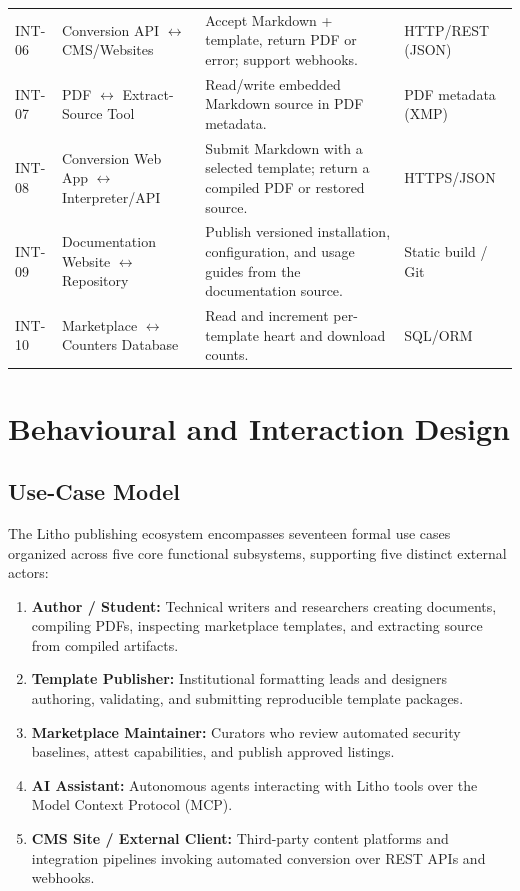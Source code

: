 \begin{xltabular}{\textwidth}{@{}p{0.13\textwidth}p{0.24\textwidth}X X@{}}
INT-06 & Conversion API $\leftrightarrow$ CMS/Websites & Accept Markdown + template, return PDF or error; support webhooks. & HTTP/REST (JSON) \\
INT-07 & PDF $\leftrightarrow$ Extract-Source Tool & Read/write embedded Markdown source in PDF metadata. & PDF metadata (XMP) \\
INT-08 & Conversion Web App $\leftrightarrow$ Interpreter/API & Submit Markdown with a selected template; return a compiled PDF or restored source. & HTTPS/JSON \\
INT-09 & Documentation Website $\leftrightarrow$ Repository & Publish versioned installation, configuration, and usage guides from the documentation source. & Static build / Git \\
INT-10 & Marketplace $\leftrightarrow$ Counters Database & Read and increment per-template heart and download counts. & SQL/ORM \\
\end{xltabular}


\section{Behavioural and Interaction Design}
\subsection{Use-Case Model}

The Litho publishing ecosystem encompasses seventeen formal use cases organized across five core functional subsystems, supporting five distinct external actors:
\begin{enumerate}
    \item \textbf{Author / Student:} Technical writers and researchers creating documents, compiling PDFs, inspecting marketplace templates, and extracting source from compiled artifacts.
    \item \textbf{Template Publisher:} Institutional formatting leads and designers authoring, validating, and submitting reproducible template packages.
    \item \textbf{Marketplace Maintainer:} Curators who review automated security baselines, attest capabilities, and publish approved listings.
    \item \textbf{AI Assistant:} Autonomous agents interacting with Litho tools over the Model Context Protocol (MCP).
    \item \textbf{CMS Site / External Client:} Third-party content platforms and integration pipelines invoking automated conversion over REST APIs and webhooks.
\end{enumerate}

